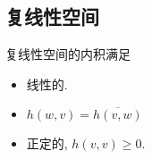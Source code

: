
\subsection{复线性空间}
复线性空间的内积满足
\begin{itemize}
  \item 线性的.
  \item $h(w,v) = \overline{h(v,w)}$ 
  \item 正定的, $h(v,v) \ge 0$.
\end{itemize}
